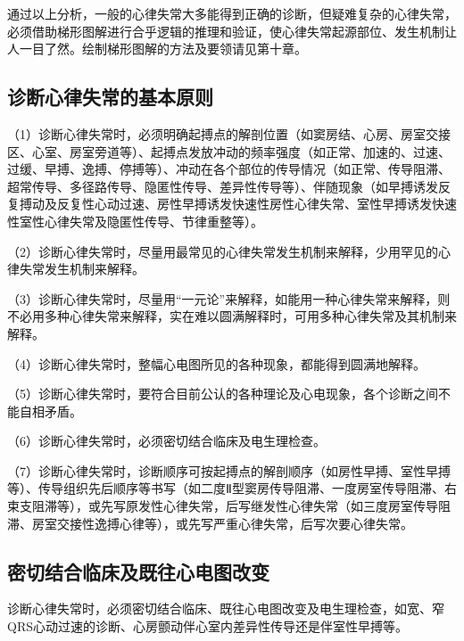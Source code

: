 通过以上分析，一般的心律失常大多能得到正确的诊断，但疑难复杂的心律失常，必须借助梯形图解进行合乎逻辑的推理和验证，使心律失常起源部位、发生机制让人一目了然。绘制梯形图解的方法及要领请见第十章。

\protect\hypertarget{text00016.htmlux5cux23subid119}{}{}

\subsection{诊断心律失常的基本原则}

（1）诊断心律失常时，必须明确起搏点的解剖位置（如窦房结、心房、房室交接区、心室、房室旁道等）、起搏点发放冲动的频率强度（如正常、加速的、过速、过缓、早搏、逸搏、停搏等）、冲动在各个部位的传导情况（如正常、传导阻滞、超常传导、多径路传导、隐匿性传导、差异性传导等）、伴随现象（如早搏诱发反复搏动及反复性心动过速、房性早搏诱发快速性房性心律失常、室性早搏诱发快速性室性心律失常及隐匿性传导、节律重整等）。

（2）诊断心律失常时，尽量用最常见的心律失常发生机制来解释，少用罕见的心律失常发生机制来解释。

（3）诊断心律失常时，尽量用“一元论”来解释，如能用一种心律失常来解释，则不必用多种心律失常来解释，实在难以圆满解释时，可用多种心律失常及其机制来解释。

（4）诊断心律失常时，整幅心电图所见的各种现象，都能得到圆满地解释。

（5）诊断心律失常时，要符合目前公认的各种理论及心电现象，各个诊断之间不能自相矛盾。

（6）诊断心律失常时，必须密切结合临床及电生理检查。

（7）诊断心律失常时，诊断顺序可按起搏点的解剖顺序（如房性早搏、室性早搏等）、传导组织先后顺序等书写（如二度Ⅱ型窦房传导阻滞、一度房室传导阻滞、右束支阻滞等），或先写原发性心律失常，后写继发性心律失常（如三度房室传导阻滞、房室交接性逸搏心律等），或先写严重心律失常，后写次要心律失常。

\protect\hypertarget{text00016.htmlux5cux23subid120}{}{}

\subsection{密切结合临床及既往心电图改变}

诊断心律失常时，必须密切结合临床、既往心电图改变及电生理检查，如宽、窄QRS心动过速的诊断、心房颤动伴心室内差异性传导还是伴室性早搏等。

\protect\hypertarget{text00017.html}{}{}

\protect\hypertarget{text00017.htmlux5cux23chapter17}{}{}

